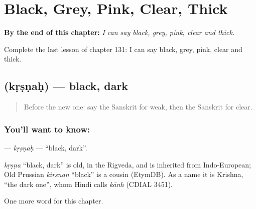 
\chapter{Black, Grey, Pink, Clear, Thick}
\label{ch:sa-black-grey-pink-clear-thick}

\begin{chapteropening}
\textbf{By the end of this chapter:} \emph{I can say black, grey, pink, clear and thick.}

Complete the last lesson of chapter 131: I can say black, grey, pink, clear and thick.
\end{chapteropening}

\section[\texorpdfstring{\sk{कृष्णः} (kṛṣṇaḥ)}{कृष्णः (kṛṣṇaḥ)}]{ (kṛṣṇaḥ) — black, dark}

\label{lesson:SA-C131-krsnah}



\begin{quote}
Before the new one: say the Sanskrit for weak, then the Sanskrit for clear.
\end{quote}

\subsection*{You'll want to know: }
\textbf{} — \emph{kṛṣṇaḥ} — \textquotedblleft{}black, dark\textquotedblright{}.

\begin{cousinweb}
\emph{kṛṣṇa} \textquotedblleft{}black, dark\textquotedblright{} is old, in the Rigveda, and is inherited from Indo-European; Old Prussian \emph{kirsnan} \textquotedblleft{}black\textquotedblright{} is a cousin (EtymDB). As a name it is Krishna, \textquotedblleft{}the dark one\textquotedblright{}, whom Hindi calls \emph{kānh} (CDIAL 3451).
\end{cousinweb}

\begin{grammarlens}[title={What you've built}]
One more word for this chapter.
\end{grammarlens}

